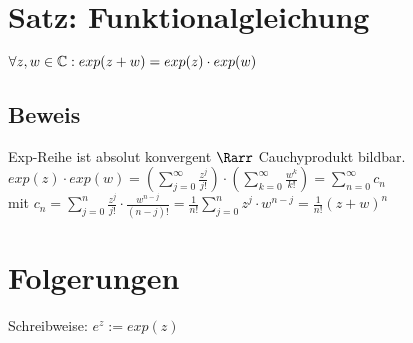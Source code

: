 \section{Satz: Funktionalgleichung}
$\forall z, w\in\text{$\mathbb{C}$}: exp(z+w) = exp(z) \cdot exp(w)$
\subsection*{Beweis}
Exp-Reihe ist absolut konvergent $\Rarr$ Cauchyprodukt bildbar.\\
$exp(z) \cdot exp(w) = \left(\sum_{j=0}^{∞} \frac{z^j}{j!}\right) \cdot \left(\sum_{k=0}^{∞} \frac{w^k}{k!}\right) =\sum_{n=0}^{∞} c_n$\\
mit $c_n = \sum_{j=0}^{n} \frac{z^j}{j!} \cdot \frac{w^{n-j}}{(n-j)!} = \frac{1}{n!}\sum_{j=0}^{n}z^j\cdot w^{n-j} = \frac{1}{n!}(z+w)^n$
\section{Folgerungen}
Schreibweise: $e^z:= exp(z)$